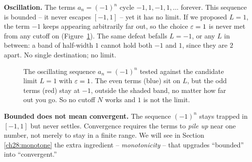 \textbf{Oscillation.} The terms $a_n = (-1)^n$ cycle $-1, 1, -1, 1, \dots$
forever. This sequence is bounded -- it never escapes $[-1, 1]$ -- yet it has no
limit. If we proposed $L = 1$, the term $-1$ keeps appearing arbitrarily far out,
so the choice $\varepsilon = 1$ is never met from any cutoff on
(Figure~\ref{ch28:fig-oscillate}). The same defeat befalls
$L = -1$, or any $L$ in between: a band of half-width $1$ cannot hold both $-1$
and $1$, since they are $2$ apart. No single destination; no limit.

\begin{figure}[htbp]
\centering
{}
\caption{The oscillating sequence $a_n = (-1)^n$ tested against the candidate
limit $L = 1$ with $\varepsilon = 1$. The even terms (blue) sit on $L$, but the odd
terms (red) stay at $-1$, outside the shaded band, no matter how far out you go.
So no cutoff $N$ works and $1$ is not the limit.}
\label{ch28:fig-oscillate}
\end{figure}

\begin{trapbox}
\textbf{Bounded does not mean convergent.} The sequence $(-1)^n$ stays trapped in
$[-1,1]$ but never settles. Convergence requires the terms to \emph{pile up} near
one number, not merely to stay in a finite range. We will see in Section
\ref{ch28:monotone} the extra ingredient -- \emph{monotonicity} -- that upgrades
``bounded'' into ``convergent.''
\end{trapbox}

